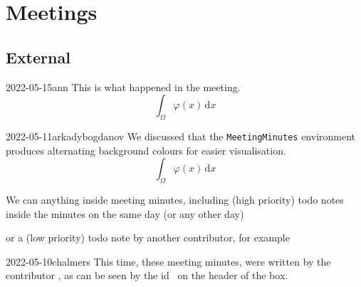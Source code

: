 \documentclass{project-logbook}
\begin{document}
{%

\section{Meetings}
	\subsection{External}
		\begin{MeetingMinutes}{2022-05-15}{ann}
			This is what happened in the meeting.
			\begin{equation}
				\int_{\Omega}{\varphi(x)}\,\mathrm{d}x
			\end{equation}
			\lipsum[4]
		\end{MeetingMinutes}
	
	\begin{MeetingMinutes}{2022-05-11}{arkadybogdanov}
		We discussed that the \texttt{MeetingMinutes} environment produces alternating background colours for easier visualisation.
		\begin{equation}
			\int_{\Omega}{\varphi(x)}\,\mathrm{d}x
		\end{equation}
		
		\lipsum[3]
		
		We can anything inside meeting minutes, including (high priority) todo notes inside the minutes on the same day (or any other day)
		
		
		or a (low priority) todo note by another contributor, for example
		
	\end{MeetingMinutes}
	
	\begin{MeetingMinutes}{2022-05-10}{chalmers}
		This time, these meeting minutes, were written by the contributor , as can be seen by the id \emph{}~on the header of the box.
		

\end{MeetingMinutes}}
\end{document}
